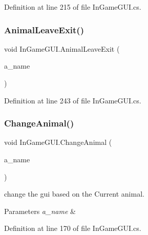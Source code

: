 Definition at line 215 of file In\+Game\+G\+U\+I.\+cs.

\mbox{\label{class_in_game_g_u_i_a1fd4667a2bb3474b90738f8e8c8db8c9}} 
\subsubsection{\texorpdfstring{Animal\+Leave\+Exit()}{AnimalLeaveExit()}}
{\footnotesize\ttfamily void In\+Game\+G\+U\+I.\+Animal\+Leave\+Exit (\begin{DoxyParamCaption}\item[{\mbox{\hyperlink{_animal_8cs_a2fa5713399b84d1b88dae9196837af50}{A\+N\+I\+M\+A\+L\+\_\+\+N\+A\+ME}}}]{a\+\_\+name }\end{DoxyParamCaption})}



Definition at line 243 of file In\+Game\+G\+U\+I.\+cs.

\mbox{\label{class_in_game_g_u_i_aeb8c5780050c59cd445fa3281bcdcee6}} 
\subsubsection{\texorpdfstring{Change\+Animal()}{ChangeAnimal()}}
{\footnotesize\ttfamily void In\+Game\+G\+U\+I.\+Change\+Animal (\begin{DoxyParamCaption}\item[{\mbox{\hyperlink{_animal_8cs_a2fa5713399b84d1b88dae9196837af50}{A\+N\+I\+M\+A\+L\+\_\+\+N\+A\+ME}}}]{a\+\_\+name }\end{DoxyParamCaption})}



change the gui based on the Current animal. 


\begin{DoxyParams}{Parameters}
{\em a\+\_\+name} & \\
\hline
\end{DoxyParams}


Definition at line 170 of file In\+Game\+G\+U\+I.\+cs.

\mbox{\label{class_in_game_g_u_i_a11794815ae083601d8e81d90cbf8641f}} 
